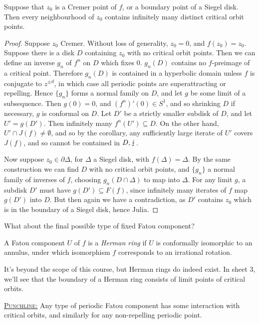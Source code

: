 \documentclass[10pt,a4paper]{article}
\begin{document}
\begin{proposition}
  Suppose that $z_0$ is a Cremer point of $f$, or a boundary point of a Siegel disk. Then every neighbourhood of $z_0$ contains infinitely many distinct critical orbit points.
\end{proposition}
\begin{proof}
  Suppose $z_0$ Cremer. Without loss of generality, $z_0 = 0$, and $f(z_0) = z_0$. Suppose there is a disk $D$ containing $z_0$ with no critical orbit points. Then we can define an inverse $g_n$ of $f^n$ on $D$ which fixes $0$. $g_n(D)$ contains no $f$-preimage of a critical point. Therefore $g_n(D)$ is contained in a hyperbolic domain unless $f$ is conjugate to $z^{\pm d}$, in which case all periodic points are superattracting or repelling. Hence $\{g_n\}$ forms a normal family on $D$, and let $g$ be some limit of a subsequence. Then $g(0) = 0$, and $(f^n)'(0) \in S^1$, and so shrinking $D$ if necessary, $g$ is conformal on $D$. Let $D'$ be a strictly smaller subdisk of $D$, and let $U' = g(D')$. Then infinitely many $f^n(U') \subseteq D$. On the other hand, $U' \cap J(f) \neq \emptyset$, and so by the corollary, any sufficiently large iterate of $U'$ covers $J(f)$, and so cannot be contained in $D, \lightning$.

  Now suppose $z_0 \in \partial \Delta$, for $\Delta$ a Siegel disk, with $f(\Delta) = \Delta$. By the same construction we can find $D$ with no critical orbit points, and $\{g_n\}$ a normal family of inverses of $f$, choosing $g_n(D \cap \Delta)$ to map into $\Delta$. For any limit $g$, a subdisk $D'$ must have $g(D') \subseteq F(f)$, since infinitely many iterates of $f$ map $g(D')$ into $D$. But then again we have a contradiction, as $D'$ contains $z_0$ which is in the boundary of a Siegel disk, hence Julia.
\end{proof}
What about the final possible type of fixed Fatou component?
\begin{definition}
  A Fatou component $U$ of $f$ is a \emph{Herman ring} if $U$ is conformally isomorphic to an annulus, under which isomorphism $f$ corresponds to an irrational rotation.
\end{definition}
It's beyond the scope of this course, but Herman rings do indeed exist. In sheet 3, we'll see that the boundary of a Herman ring consists of limit points of critical orbits.

\underline{\textsc{Punchline:}} Any type of periodic Fatou component has some interaction with critical orbits, and similarly for any non-repelling periodic point.
\end{document}
